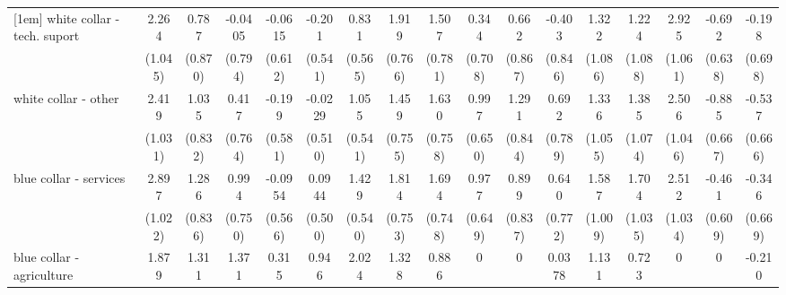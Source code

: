 {\begin{tabular}{l*{16}{c}}
[1em]
white collar - tech. suport&       2.264\sym{*}  &       0.787         &     -0.0405         &     -0.0615         &      -0.201         &       0.831         &       1.919\sym{*}  &       1.507         &       0.344         &       0.662         &      -0.403         &       1.322         &       1.224         &       2.925\sym{**} &      -0.692         &      -0.198         \\
                    &     (1.045)         &     (0.870)         &     (0.794)         &     (0.612)         &     (0.541)         &     (0.565)         &     (0.766)         &     (0.781)         &     (0.708)         &     (0.867)         &     (0.846)         &     (1.086)         &     (1.088)         &     (1.061)         &     (0.638)         &     (0.698)         \\
[1em]
white collar - other&       2.419\sym{*}  &       1.035         &       0.417         &      -0.199         &     -0.0229         &       1.055         &       1.459         &       1.630\sym{*}  &       0.997         &       1.291         &       0.692         &       1.336         &       1.385         &       2.506\sym{*}  &      -0.885         &      -0.537         \\
                    &     (1.031)         &     (0.832)         &     (0.764)         &     (0.581)         &     (0.510)         &     (0.541)         &     (0.755)         &     (0.758)         &     (0.650)         &     (0.844)         &     (0.789)         &     (1.055)         &     (1.074)         &     (1.046)         &     (0.667)         &     (0.666)         \\
[1em]
blue collar - services&       2.897\sym{**} &       1.286         &       0.994         &     -0.0954         &      0.0944         &       1.429\sym{**} &       1.814\sym{*}  &       1.694\sym{*}  &       0.977         &       0.899         &       0.640         &       1.587         &       1.704         &       2.512\sym{*}  &      -0.461         &      -0.346         \\
                    &     (1.022)         &     (0.836)         &     (0.750)         &     (0.566)         &     (0.500)         &     (0.540)         &     (0.753)         &     (0.748)         &     (0.649)         &     (0.837)         &     (0.772)         &     (1.009)         &     (1.035)         &     (1.034)         &     (0.609)         &     (0.669)         \\
[1em]
blue collar - agriculture&       1.879         &       1.311         &       1.371         &       0.315         &       0.946         &       2.024\sym{**} &       1.328         &       0.886         &           0         &           0         &      0.0378         &       1.131         &       0.723         &           0         &           0         &      -0.210         \\

\end{tabular}}
